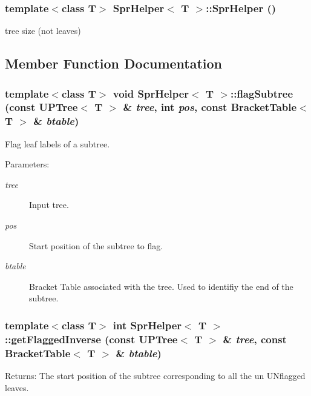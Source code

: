 \subsubsection{\setlength{\rightskip}{0pt plus 5cm}template$<$class T$>$ {\bf Spr\-Helper}$<$ T $>$::{\bf Spr\-Helper} ()\hspace{0.3cm}{\tt  [private]}}\label{classSprHelper_d0}


tree size (not leaves) 



\subsection{Member Function Documentation}
\subsubsection{\setlength{\rightskip}{0pt plus 5cm}template$<$class T$>$ void {\bf Spr\-Helper}$<$ T $>$::flag\-Subtree (const {\bf UPTree}$<$ T $>$ \& {\em tree}, int {\em pos}, const {\bf Bracket\-Table}$<$ T $>$ \& {\em btable})}\label{classSprHelper_a2}


Flag leaf labels of a subtree. 

\begin{Desc}
\item[Parameters:]
\begin{description}
\item[{\em tree}]Input tree. \item[{\em pos}]Start position of the subtree to flag. \item[{\em btable}]Bracket Table associated with the tree. Used to identifiy the end of the subtree. \end{description}
\end{Desc}
\subsubsection{\setlength{\rightskip}{0pt plus 5cm}template$<$class T$>$ int {\bf Spr\-Helper}$<$ T $>$::get\-Flagged\-Inverse (const {\bf UPTree}$<$ T $>$ \& {\em tree}, const {\bf Bracket\-Table}$<$ T $>$ \& {\em btable})}\label{classSprHelper_a3}


\begin{Desc}
\item[Returns:]The start position of the subtree corresponding to all the un UNflagged leaves. \end{Desc}
